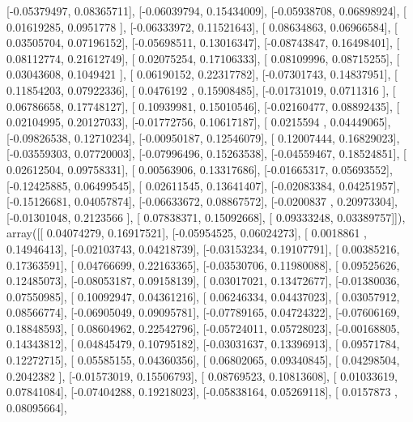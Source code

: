 \documentclass{article}
\begin{document}
       [-0.05379497,  0.08365711],
       [-0.06039794,  0.15434009],
       [-0.05938708,  0.06898924],
       [ 0.01619285,  0.0951778 ],
       [-0.06333972,  0.11521643],
       [ 0.08634863,  0.06966584],
       [ 0.03505704,  0.07196152],
       [-0.05698511,  0.13016347],
       [-0.08743847,  0.16498401],
       [ 0.08112774,  0.21612749],
       [ 0.02075254,  0.17106333],
       [ 0.08109996,  0.08715255],
       [ 0.03043608,  0.1049421 ],
       [ 0.06190152,  0.22317782],
       [-0.07301743,  0.14837951],
       [ 0.11854203,  0.07922336],
       [ 0.0476192 ,  0.15908485],
       [-0.01731019,  0.0711316 ],
       [ 0.06786658,  0.17748127],
       [ 0.10939981,  0.15010546],
       [-0.02160477,  0.08892435],
       [ 0.02104995,  0.20127033],
       [-0.01772756,  0.10617187],
       [ 0.0215594 ,  0.04449065],
       [-0.09826538,  0.12710234],
       [-0.00950187,  0.12546079],
       [ 0.12007444,  0.16829023],
       [-0.03559303,  0.07720003],
       [-0.07996496,  0.15263538],
       [-0.04559467,  0.18524851],
       [ 0.02612504,  0.09758331],
       [ 0.00563906,  0.13317686],
       [-0.01665317,  0.05693552],
       [-0.12425885,  0.06499545],
       [ 0.02611545,  0.13641407],
       [-0.02083384,  0.04251957],
       [-0.15126681,  0.04057874],
       [-0.06633672,  0.08867572],
       [-0.0200837 ,  0.20973304],
       [-0.01301048,  0.2123566 ],
       [ 0.07838371,  0.15092668],
       [ 0.09333248,  0.03389757]]), array([[ 0.04074279,  0.16917521],
       [-0.05954525,  0.06024273],
       [ 0.0018861 ,  0.14946413],
       [-0.02103743,  0.04218739],
       [-0.03153234,  0.19107791],
       [ 0.00385216,  0.17363591],
       [ 0.04766699,  0.22163365],
       [-0.03530706,  0.11980088],
       [ 0.09525626,  0.12485073],
       [-0.08053187,  0.09158139],
       [ 0.03017021,  0.13472677],
       [-0.01380036,  0.07550985],
       [ 0.10092947,  0.04361216],
       [ 0.06246334,  0.04437023],
       [ 0.03057912,  0.08566774],
       [-0.06905049,  0.09095781],
       [-0.07789165,  0.04724322],
       [-0.07606169,  0.18848593],
       [ 0.08604962,  0.22542796],
       [-0.05724011,  0.05728023],
       [-0.00168805,  0.14343812],
       [ 0.04845479,  0.10795182],
       [-0.03031637,  0.13396913],
       [ 0.09571784,  0.12272715],
       [ 0.05585155,  0.04360356],
       [ 0.06802065,  0.09340845],
       [ 0.04298504,  0.2042382 ],
       [-0.01573019,  0.15506793],
       [ 0.08769523,  0.10813608],
       [ 0.01033619,  0.07841084],
       [-0.07404288,  0.19218023],
       [-0.05838164,  0.05269118],
       [ 0.0157873 ,  0.08095664],
\end{document}
